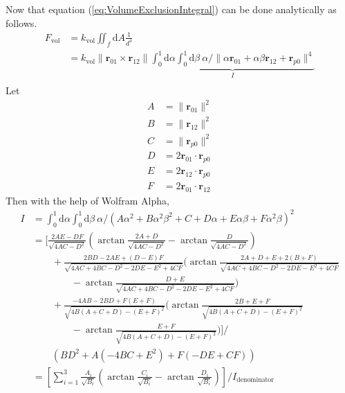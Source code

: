 \documentclass[main.tex]{subfiles}
\begin{document}
Now that equation (\ref{eq:VolumeExclusionIntegral}) can be done analytically as follows.
\begin{equation}
\begin{aligned}
F_\text{vol} &= k_\text{vol} \iint_f \mathrm{d}A \frac1{d^4}\\
&= k_\text{vol} \| \bm{r}_{01} \times \bm{r}_{12} \| \underbrace{\int_0^1 \mathrm{d}\alpha \int_0^1 \mathrm{d}\beta \ \alpha / \| \alpha\bm{r}_{01} + \alpha\beta\bm{r}_{12} + \bm{r}_{p0} \|^4}_I\\
\end{aligned}
\end{equation}
Let
\begin{equation}
\begin{aligned}
A &= \|\bm{r}_{01}\|^2\\
B &= \|\bm{r}_{12}\|^2\\
C &= \|\bm{r}_{p0}\|^2\\
D &= 2\bm{r}_{01}\cdot\bm{r}_{p0}\\
E &= 2\bm{r}_{12}\cdot\bm{r}_{p0}\\
F &= 2\bm{r}_{01}\cdot\bm{r}_{12}
\end{aligned}
\end{equation}
Then with the help of Wolfram Alpha,
\begin{equation}
\begin{aligned}
I &= \int_0^1 \mathrm{d}\alpha \int_0^1 \mathrm{d}\beta \ \alpha / \left( A\alpha^2 + B\alpha^2\beta^2 + C + D\alpha + E\alpha\beta + F\alpha^2\beta \right)^2\\
&= \Biggl[ \frac{2AE-DF}{\sqrt{4AC-D^2}} \left( \arctan\frac{2A+D}{\sqrt{4AC-D^2}} - \arctan\frac{D}{\sqrt{4AC-D^2}} \right)\\
&  \qquad + \frac{2BD-2AE+(D-E)F}{\sqrt{4AC+4BC-D^2-2DE-E^2+4CF}} \biggl( \arctan\frac{2A+D+E+2(B+F)}{\sqrt{4AC+4BC-D^2-2DE-E^2+4CF}}\\
&  \qquad \qquad - \arctan\frac{D+E}{\sqrt{4AC+4BC-D^2-2DE-E^2+4CF}} \biggr)\\
&  \qquad + \frac{-4AB-2BD+F(E+F)}{\sqrt{4B(A+C+D)-(E+F)^2}} \biggl( \arctan\frac{2B+E+F}{\sqrt{4B(A+C+D)-(E+F)^2}}\\
&  \qquad \qquad - \arctan\frac{E+F}{\sqrt{4B(A+C+D)-(E+F)^2}} \biggr)\Biggr] / \\
&  \qquad \left( BD^2 + A(-4BC+E^2) + F(-DE+CF) \right)\\
&= \left[ \sum_{i=1}^3 \frac{A_i}{\sqrt{B_i}} \left( \arctan\frac{C_i}{\sqrt{B_i}} - \arctan\frac{D_i}{\sqrt{B_i}} \right) \right] / I_\text{denominator}\\
\end{aligned}
\end{equation}
\end{document}
